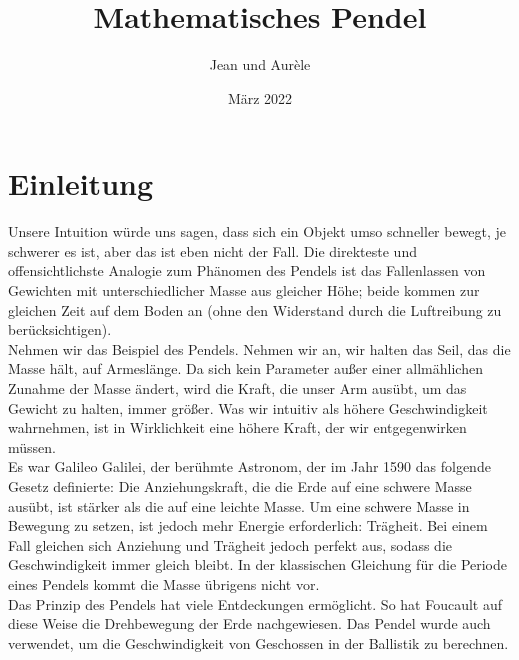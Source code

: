 \documentclass{report}
\title{Mathematisches Pendel}
\author{Jean und Aurèle}
\date{März 2022}
\begin{document}
    \maketitle
    \section*{Einleitung}
    Unsere Intuition würde uns sagen, dass sich ein Objekt umso schneller bewegt, je schwerer 
es ist, aber das ist eben nicht der Fall. Die direkteste und offensichtlichste Analogie zum Phänomen des Pendels ist das Fallenlassen von Gewichten mit unterschiedlicher Masse aus gleicher Höhe; beide kommen zur gleichen Zeit auf dem Boden an (ohne den Widerstand durch die Luftreibung zu berücksichtigen).\\

Nehmen wir das Beispiel des Pendels. Nehmen wir an, wir halten das Seil, das die Masse hält, auf Armeslänge. Da sich kein Parameter außer einer allmählichen Zunahme der Masse ändert, wird die Kraft, die unser Arm ausübt, um das Gewicht zu halten, immer größer.  Was wir intuitiv als höhere Geschwindigkeit wahrnehmen, ist in Wirklichkeit eine höhere Kraft, der wir entgegenwirken müssen.\\

Es war Galileo Galilei, der berühmte Astronom, der im Jahr 1590 das folgende Gesetz definierte: Die Anziehungskraft, die die Erde auf eine schwere Masse ausübt, ist stärker als die auf eine leichte Masse. Um eine schwere Masse in Bewegung zu setzen, ist jedoch mehr Energie erforderlich: Trägheit. 
Bei einem Fall gleichen sich Anziehung und Trägheit jedoch perfekt aus, sodass die Geschwindigkeit immer gleich bleibt. 
In der klassischen Gleichung für die Periode eines Pendels kommt die Masse übrigens nicht vor. \\

Das Prinzip des Pendels hat viele Entdeckungen ermöglicht. So hat Foucault auf diese Weise die Drehbewegung der Erde nachgewiesen. Das Pendel wurde auch verwendet, um die Geschwindigkeit von Geschossen in der Ballistik zu berechnen.
\end{document}
